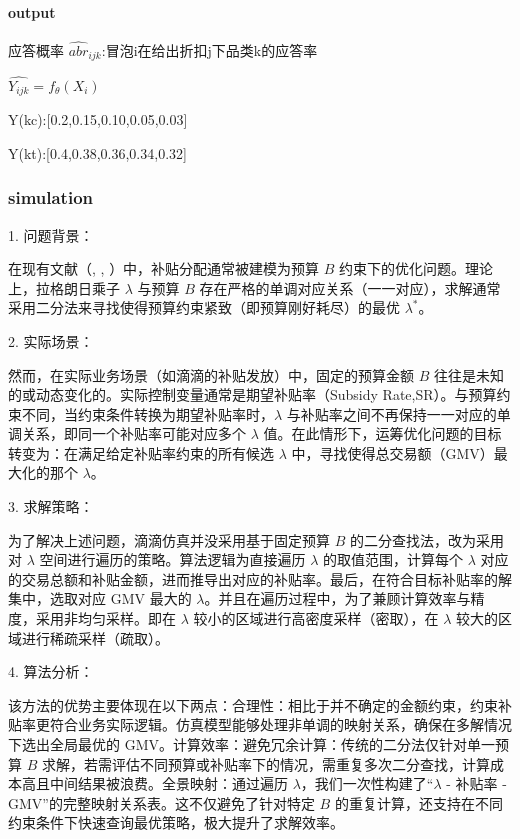 \documentclass[12pt, a4paper]{article}
\begin{document}
\paragraph{output}
应答概率
$\hat{{abr}}_{ijk}$:冒泡i在给出折扣j下品类k的应答率\par
$\hat{Y_{ijk}}=f_\theta(X_i)$\par
Y(kc):[0.2,0.15,0.10,0.05,0.03]\par
Y(kt):[0.4,0.38,0.36,0.34,0.32]

\subsubsection{simulation}


1. 问题背景：

在现有文献（\cite{chen2023two}, \cite{zhang2021bcorle}, \cite{zhou2024decision}）中，补贴分配通常被建模为预算 $B$ 约束下的优化问题。理论上，拉格朗日乘子 $\lambda$ 与预算 $B$ 存在严格的单调对应关系（一一对应），求解通常采用二分法来寻找使得预算约束紧致（即预算刚好耗尽）的最优 $\lambda^*$。

2. 实际场景：

然而，在实际业务场景（如滴滴的补贴发放）中，固定的预算金额 $B$ 往往是未知的或动态变化的。实际控制变量通常是期望补贴率（Subsidy Rate,SR）。与预算约束不同，当约束条件转换为期望补贴率时，$\lambda$ 与补贴率之间不再保持一一对应的单调关系，即同一个补贴率可能对应多个 $\lambda$ 值。在此情形下，运筹优化问题的目标转变为：在满足给定补贴率约束的所有候选 $\lambda$ 中，寻找使得总交易额（GMV）最大化的那个 $\lambda$。

3. 求解策略：

为了解决上述问题，滴滴仿真并没采用基于固定预算 $B$ 的二分查找法，改为采用对 $\lambda$ 空间进行遍历的策略。算法逻辑为直接遍历 $\lambda$ 的取值范围，计算每个 $\lambda$ 对应的交易总额和补贴金额，进而推导出对应的补贴率。最后，在符合目标补贴率的解集中，选取对应 GMV 最大的 $\lambda$。并且在遍历过程中，为了兼顾计算效率与精度，采用非均匀采样。即在 $\lambda$ 较小的区域进行高密度采样（密取），在 $\lambda$ 较大的区域进行稀疏采样（疏取）。

4. 算法分析：

该方法的优势主要体现在以下两点：合理性：相比于并不确定的金额约束，约束补贴率更符合业务实际逻辑。仿真模型能够处理非单调的映射关系，确保在多解情况下选出全局最优的 GMV。计算效率：避免冗余计算：传统的二分法仅针对单一预算 $B$ 求解，若需评估不同预算或补贴率下的情况，需重复多次二分查找，计算成本高且中间结果被浪费。全景映射：通过遍历 $\lambda$，我们一次性构建了“$\lambda$ - 补贴率 - GMV”的完整映射关系表。这不仅避免了针对特定 $B$ 的重复计算，还支持在不同约束条件下快速查询最优策略，极大提升了求解效率。
\end{document}
